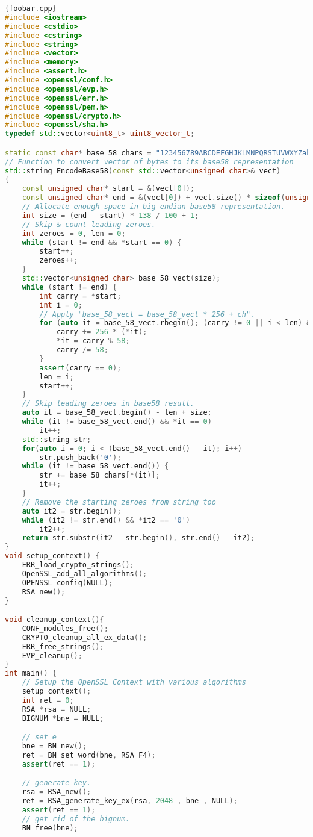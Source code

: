 \begin{lstlisting}[language=c++]{foobar.cpp}
#include <iostream>
#include <cstdio>
#include <cstring>
#include <string>
#include <vector>
#include <memory>
#include <assert.h>
#include <openssl/conf.h>
#include <openssl/evp.h>
#include <openssl/err.h>
#include <openssl/pem.h>
#include <openssl/crypto.h>
#include <openssl/sha.h>
typedef std::vector<uint8_t> uint8_vector_t;

static const char* base_58_chars = "123456789ABCDEFGHJKLMNPQRSTUVWXYZabcdefghijkmnopqrstuvwxyz";
// Function to convert vector of bytes to its base58 representation
std::string EncodeBase58(const std::vector<unsigned char>& vect)
{
	const unsigned char* start = &(vect[0]);
	const unsigned char* end = &(vect[0]) + vect.size() * sizeof(unsigned char);
	// Allocate enough space in big-endian base58 representation.
	int size = (end - start) * 138 / 100 + 1; 
	// Skip & count leading zeroes.
	int zeroes = 0, len = 0;
	while (start != end && *start == 0) {
		start++;
		zeroes++;
	}
	std::vector<unsigned char> base_58_vect(size);
	while (start != end) {
		int carry = *start;
		int i = 0;
		// Apply "base_58_vect = base_58_vect * 256 + ch".
		for (auto it = base_58_vect.rbegin(); (carry != 0 || i < len) && (it != base_58_vect.rend()); it++, i++) {
			carry += 256 * (*it);
			*it = carry % 58;
			carry /= 58;
		}
		assert(carry == 0);
		len = i;
		start++;
	}
	// Skip leading zeroes in base58 result.
	auto it = base_58_vect.begin() - len + size;
	while (it != base_58_vect.end() && *it == 0)
		it++;
	std::string str;
	for(auto i = 0; i < (base_58_vect.end() - it); i++)
		str.push_back('0');
	while (it != base_58_vect.end()) {
		str += base_58_chars[*(it)];
		it++;
	}
	// Remove the starting zeroes from string too
	auto it2 = str.begin(); 
	while (it2 != str.end() && *it2 == '0')
		it2++;
	return str.substr(it2 - str.begin(), str.end() - it2);
}
void setup_context() {
	ERR_load_crypto_strings();
	OpenSSL_add_all_algorithms();
	OPENSSL_config(NULL);
	RSA_new();
}

void cleanup_context(){
	CONF_modules_free();
	CRYPTO_cleanup_all_ex_data();
	ERR_free_strings();
	EVP_cleanup();
}
int main() {
	// Setup the OpenSSL Context with various algorithms
	setup_context();
	int ret = 0;
	RSA *rsa = NULL;
	BIGNUM *bne = NULL;

	// set e
	bne = BN_new();
	ret = BN_set_word(bne, RSA_F4);
	assert(ret == 1);

	// generate key.
	rsa = RSA_new();
	ret = RSA_generate_key_ex(rsa, 2048 , bne , NULL);
	assert(ret == 1);
	// get rid of the bignum.
	BN_free(bne);


\end{lstlisting}
